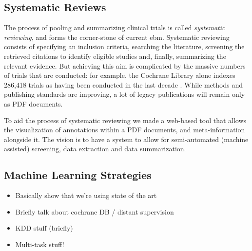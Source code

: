 \documentclass[runningheads,a4paper]{llncs}
\begin{document}
\subsection{Systematic Reviews}
The process of pooling and summarizing clinical trials is called \emph{systematic reviewing}, and forms the corner-stone of current \ac{ebm}.
Systematic reviewing consists of specifying an inclusion criteria, searching the literature, screening the retrieved citations to identify eligible studies and, finally, summarizing the relevant evidence.
But achieving this aim is complicated by the massive numbers of trials that are conducted: for example, the Cochrane Library alone indexes 286,418 trials as having been conducted in the last decade \cite{valkenhoef2012}.
While methods and publishing standards are improving, a lot of legacy publications will remain only as PDF documents.

To aid the process of systematic reviewing we made a web-based tool that allows the visualization of annotations within a PDF documents, and meta-information alongside it.
The vision is to have a system to allow for semi-automated (machine assisted) screening, data extraction and data summarization.

\subsection{Machine Learning Strategies}

\begin{itemize}
\item Basically show that we're using state of the art
\item Briefly talk about cochrane DB / distant supervision
\item KDD stuff (briefly)
\item Multi-task stuff!
\end{itemize}
\end{document}
